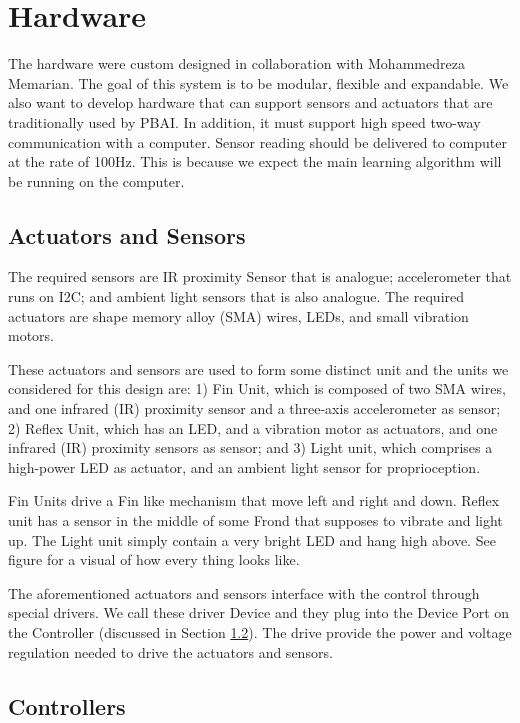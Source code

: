 \section{Hardware} \label{sec:hardware}

The hardware were custom designed in collaboration with Mohammedreza Memarian. The goal of this system is to be modular, flexible and expandable. We also want to develop hardware that can support sensors and actuators that are traditionally used by PBAI. In addition, it must support high speed two-way communication with a computer. Sensor reading should be delivered to computer at the rate of 100Hz. This is because we expect the main learning algorithm will be running on the computer. 

\subsection{Actuators and Sensors}


The required sensors are IR proximity Sensor that is analogue; accelerometer that runs on I2C; and ambient light sensors that is also analogue. The required actuators are shape memory alloy (SMA) wires, LEDs, and small vibration motors. 

These actuators and sensors are used to form some distinct unit and the units we considered for this design are: 1) Fin Unit, which is composed of two SMA wires, and one infrared (IR) proximity sensor and a three-axis accelerometer as sensor; 2) Reflex Unit, which has an LED, and a vibration motor as actuators, and one infrared (IR) proximity sensors as sensor; and 3) Light unit, which comprises a high-power LED as actuator, and an ambient light sensor for proprioception.

Fin Units drive a Fin like mechanism that move left and right and down. Reflex unit has a sensor in the middle of some Frond that supposes to vibrate and light up. The Light unit simply contain a very bright LED and hang high above.
See figure for a visual of how every thing looks like.

The aforementioned actuators and sensors interface with the control through special drivers. We call these driver Device and they plug into the Device Port on the Controller (discussed in Section \ref{subsec:controller}). The drive provide the power and voltage regulation needed to drive the actuators and sensors. 

\subsection{Controllers}\label{subsec:controller}

